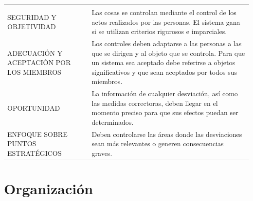 \documentclass[
]{krantz}
\begin{document}
\begin{longtable}[]{@{}ll@{}}
\begin{minipage}[t]{0.39\columnwidth}
\end{minipage}\tabularnewline
\begin{minipage}[t]{0.55\columnwidth}\raggedright
SEGURIDAD Y OBJETIVIDAD\strut
\end{minipage} & \begin{minipage}[t]{0.39\columnwidth}\raggedright
Las cosas se controlan mediante el control de los actos realizados por las personas. El sistema gana si se utilizan criterios rigurosos e imparciales.\strut
\end{minipage}\tabularnewline
\begin{minipage}[t]{0.55\columnwidth}\raggedright
ADECUACIÓN Y ACEPTACIÓN POR LOS MIEMBROS\strut
\end{minipage} & \begin{minipage}[t]{0.39\columnwidth}\raggedright
Los controles deben adaptarse a las personas a las que se dirigen y al objeto que se controla. Para que un sistema sea aceptado debe referirse a objetos significativos y que sean aceptados por todos sus miembros.\strut
\end{minipage}\tabularnewline
\begin{minipage}[t]{0.55\columnwidth}\raggedright
OPORTUNIDAD\strut
\end{minipage} & \begin{minipage}[t]{0.39\columnwidth}\raggedright
La información de cualquier desviación, así como las medidas correctoras, deben llegar en el momento preciso para que sus efectos puedan ser determinados.\strut
\end{minipage}\tabularnewline
\begin{minipage}[t]{0.55\columnwidth}\raggedright
ENFOQUE SOBRE PUNTOS ESTRATÉGICOS\strut
\end{minipage} & \begin{minipage}[t]{0.39\columnwidth}\raggedright
Deben controlarse las áreas donde las desviaciones sean más relevantes o generen consecuencias graves.\strut
\end{minipage}\tabularnewline
\bottomrule
\end{longtable}

\hypertarget{organizaciuxf3n}{%
\chapter{Organización}\label{organizaciuxf3n}}
\end{document}
